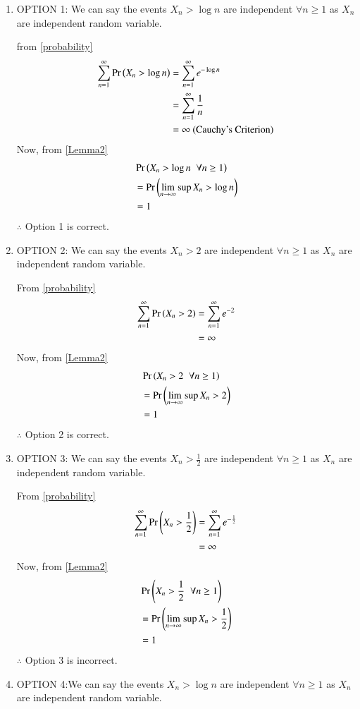 \documentclass[journal,12pt,twocolumn]{IEEEtran}
\begin{document}
\begin{enumerate}
    \item OPTION 1: 
    We can say the events $X_n>\log n$ are independent $\forall n\geq 1$ as $X_n$ are independent random variable.
    
   from \eqref{probability}
    \begin{align}
        \sum_{n=1}^{\infty}\Pr\left(X_n > \log n\right) &=\sum_{n=1}^{\infty}e^{-\log n}\\ &=\sum_{n=1}^{\infty}\frac{1}{n}\\
        &= \infty\text{ (Cauchy's Criterion)}  
    \end{align}
    Now, from \ref{Lemma2}
    \begin{align}
        &\Pr\left(X_n>\log n\hspace{0.2cm} \forall n\geq1\right)\\
        &=\Pr\left(\lim_{n \rightarrow \infty}\sup X_n>\log n\right)\\
        &=1
    \end{align}
    $\therefore$ Option 1 is correct. 
    
    \item OPTION 2: We can say the events $X_n>2$ are independent $\forall n\geq 1$ as $X_n$ are independent random variable.
    
    From \eqref{probability}
    \begin{align}
        \sum_{n=1}^{\infty}\Pr\left(X_n > 2\right) &= \sum_{n=1}^{\infty}e^{-2}\\
                                            &= \infty
    \end{align}
    Now, from \ref{Lemma2}
    \begin{align}
        &\Pr\left(X_n>2 \hspace{0.2cm} \forall n\geq1\right)\\
        &=\Pr\left(\lim_{n \rightarrow \infty}\sup X_n>2\right)\\
        &=1
    \end{align}
    $\therefore$ Option 2 is correct.
    
    \item OPTION 3: We can say the events $X_n>\frac{1}{2}$ are independent $\forall n\geq 1$ as $X_n$ are independent random variable.
    
    From \eqref{probability}
    \begin{align}
        \sum_{n=1}^{\infty}\Pr\left(X_n > \frac{1}{2}\right) &= \sum_{n=1}^{\infty}e^{-\frac{1}{2}}\\
                                            &= \infty
    \end{align}
    Now, from \ref{Lemma2}
    \begin{align}
        &\Pr\left(X_n>\frac{1}{2} \hspace{0.2cm} \forall n\geq1\right)\\
        &=\Pr\left(\lim_{n \rightarrow \infty}\sup X_n>\frac{1}{2}\right)\\
        &=1
    \end{align}
    $\therefore$ Option 3 is incorrect.
    \item OPTION 4:We can say the events $X_n>\log n$ are independent $\forall n\geq 1$ as $X_n$ are independent random variable.
    

\end{enumerate}
\end{document}
